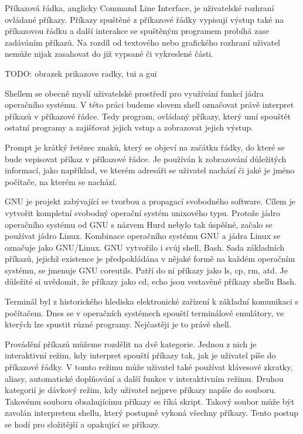 \documentclass[thesis=M,czech]{FITthesis}[2012/06/26]
\begin{document}
Příkazová řádka, anglicky Command Line Interface, je uživatelské rozhraní ovládané příkazy. Příkazy spuštěné z příkazové řádky vypisují výstup také na příkazovou řádku a další interakce se spuštěným programem probíhá zase zadáváním příkazů. Na rozdíl od textového nebo grafického rozhraní uživatel nemůže nijak zasahovat do již vypsané či vykreslené části.

TODO: obrazek prikazove radky, tui a gui

Shellem se obecně myslí uživatelské prostředí pro využívání funkcí jádra operačního systému. V této práci budeme slovem shell označovat právě interpret příkazů v příkazové řádce. Tedy program, ovládaný příkazy, který umí spouštět ostatní programy a zajišťovat jejich vstup a zobrazovat jejich výstup.

Prompt je krátký řetězec znaků, který se objeví na začátku řádky, do které se bude vepisovat příkaz v příkazové řádce. Je používán k zobrazování důležitých informací, jako například, ve kterém adresáři se uživatel nachází či jaké je jméno počítače, na kterém se nachází.


GNU je projekt zabývající se tvorbou a propagací svobodného software. Cílem je vytvořit kompletní svobodný operační systém unixového typu. Protože jádro operačního systému od GNU s názvem Hurd nebylo tak úspěšné, začalo se používat jádro Linux. Kombinace operačního systému GNU a jádra Linux se označuje jako GNU/Linux. GNU vytvořilo i svůj shell, Bash. Sada základních příkazů, jejichž existence je předpokládána v nějaké formě na každém operačním systému, se jmenuje GNU coreutils. Patří do ní příkazy jako ls, cp, rm, atd. Je důležité si uvědomit, že příkazy jako cd, echo jsou vestavěné příkazy shellu Bash.


Terminál byl z historického hlediska elektronické zařízení k základní komunikaci s počítačem. Dnes se v operačních systémech spouští terminálové emulátory, ve kterých lze spustit různé programy. Nejčastěji je to právě shell.


Provádění příkazů můžeme rozdělit na dvě kategorie. Jednou z nich je interaktivní režim, kdy interpret spouští příkazy tak, jak je uživatel píše do příkazové řádky. V tomto režimu může uživatel také používat klávesové zkratky, aliasy, automatické doplňování a další funkce v interaktivním režimu. Druhou kategorií je dávkový režim, kdy uživatel nejprve příkazy napíše do souboru. Takovému souboru obsahujícímu příkazy se říká skript. Takový soubor může být zavolán interpretem shellu, který postupně vykoná všechny příkazy. Tento postup se hodí pro složitější a opakující se příkazy.
\end{document}
